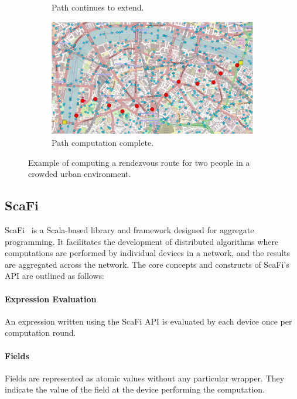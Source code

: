 \begin{figure}
\begin{subfigure}[b]{.49\textwidth}
        \caption{Path continues to extend.}
        \label{fig:protelis-example-c}
    \end{subfigure}
    \hfill
    \begin{subfigure}[b]{.49\textwidth}
        \centering
        \includegraphics[width=\textwidth]{figures/protelis-example-d.png}
        \caption{Path computation complete.}
        \label{fig:protelis-example-d}
    \end{subfigure}
    \caption{Example of computing a rendezvous route for two people in a crowded urban environment.}
    \label{fig:protelis-example-map}
\end{figure}


\subsection{ScaFi}

ScaFi~\cite{Casadei2022} is a Scala-based library and framework designed for aggregate programming. It facilitates the development of distributed algorithms where computations are performed by individual devices in a network, and the results are aggregated across the network. The core concepts and constructs of ScaFi's API are outlined as follows:

\paragraph{Expression Evaluation}
An expression written using the ScaFi API is evaluated by each device once per computation round.

\paragraph{Fields}
Fields are represented as atomic values without any particular wrapper. They indicate the value of the field at the device performing the computation.

